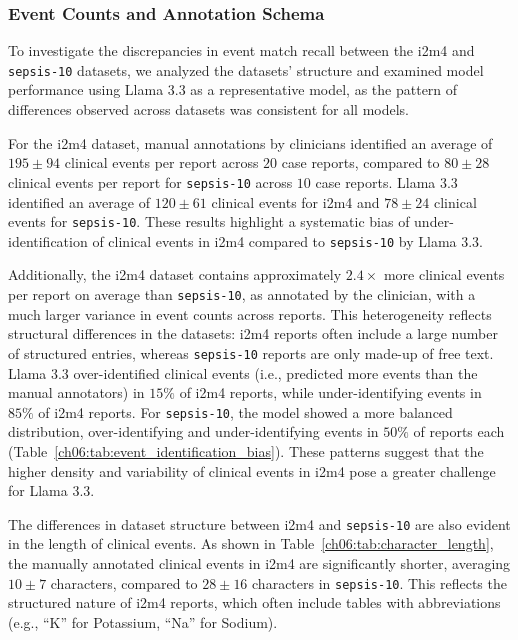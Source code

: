 
\subsubsection{Event Counts and Annotation Schema}\label{ch06:apd:error-analysis}
To investigate the discrepancies in event match recall between the i2m4 and \texttt{sepsis-10} datasets, we analyzed the datasets' structure and examined model performance using Llama 3.3 as a representative model, as the pattern of differences observed across datasets was consistent for all models.

For the i2m4 dataset, manual annotations by clinicians identified an average of $195\pm94$ clinical events per report across $20$ case reports, compared to $80\pm28$ clinical events per report for \texttt{sepsis-10} across $10$ case reports.
Llama 3.3 identified an average of $120\pm61$ clinical events for i2m4 and $78\pm24$ clinical events for \texttt{sepsis-10}.
These results highlight a systematic bias of under-identification of clinical events in i2m4 compared to \texttt{sepsis-10} by Llama 3.3.

Additionally, the i2m4 dataset contains approximately $2.4\times$ more clinical events per report on average than \texttt{sepsis-10}, as annotated by the clinician, with a much larger variance in event counts across reports.
This heterogeneity reflects structural differences in the datasets: i2m4 reports often include a large number of structured entries, whereas \texttt{sepsis-10} reports are only made-up of free text.
Llama 3.3 over-identified clinical events (i.e., predicted more events than the manual annotators) in $15\%$ of i2m4 reports, while under-identifying events in $85\%$ of i2m4 reports.
For \texttt{sepsis-10}, the model showed a more balanced distribution, over-identifying and under-identifying events in $50\%$ of reports each (Table~\ref{ch06:tab:event_identification_bias}).
These patterns suggest that the higher density and variability of clinical events in i2m4 pose a greater challenge for Llama 3.3.









The differences in dataset structure between i2m4 and \texttt{sepsis-10} are also evident in the length of clinical events.
As shown in Table~\ref{ch06:tab:character_length}, the manually annotated clinical events in i2m4 are significantly shorter, averaging $10\pm7$ characters, compared to $28\pm16$ characters in \texttt{sepsis-10}.
This reflects the structured nature of i2m4 reports, which often include tables with abbreviations (e.g., ``K'' for Potassium, ``Na'' for Sodium).



